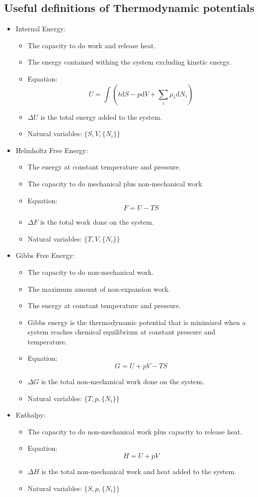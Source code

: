 \documentclass[11pt]{article}
\begin{document}
\begin{enumerate}
\subsection{Useful definitions of Thermodynamic potentials}
\label{sec:org2a40070}
\begin{itemize}
\item Internal Energy:
\begin{itemize}
\item The capacity to do work and release heat.
\item The energy contained withing the system excluding kinetic energy.
\item Equation: \[ U = \int ( t\text{d}S -p\text{d}V + \sum_{i}\mu_{i}\text{d}N_{i} ) \]
\item \(\Delta U\) is the total energy added to the system.
\item Natural variables: \(\{ S, V, \{N_{i}\} \}\)
\end{itemize}
\item Helmholtz Free Energy:
\begin{itemize}
\item The energy at constant temperature and pressure.
\item The capacity to do mechanical plus non-mechanical work
\item Equation: \[ F = U - TS \]
\item \(\Delta F\) is the total work done on the system.
\item Natural variables: \(\{ T, V, \{N_{i}\} \}\)
\end{itemize}
\item Gibbs Free Energy:
\begin{itemize}
\item The capacity to do non-mechanical work.
\item The maximum amount of non-expansion work.
\item The energy at constant temperature and pressure.
\item Gibbs energy is the thermodynamic potential that is minimized when a
system reaches chemical equilibrium at constant pressure and
temperature.
\item Equation: \[ G = U + pV - TS  \]
\item \(\Delta G\) is the total non-mechanical work done on the system.
\item Natural variables: \(\{ T, p, \{N_{i}\} \}\)
\end{itemize}
\item Enthalpy:
\begin{itemize}
\item The capacity to do non-mechanical work plus capacity to release heat.
\item Equation: \[ H = U + pV \]
\item \(\Delta H\) is the total non-mechanical work and heat added to the
system.
\item Natural variables: \(\{ S, p, \{N_{i}\} \}\)
\end{itemize}
\end{itemize}


\end{enumerate}
\end{document}
